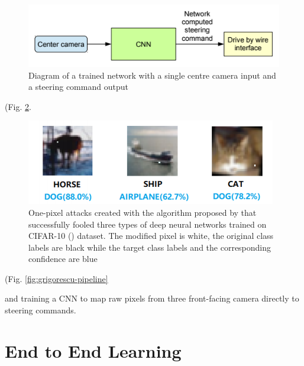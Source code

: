 \begin{figure}[ht]
 \centering 
 \includegraphics[scale=1]{Figures/bojarski-nvidia.png}
 \caption{Diagram of a trained network with a single centre camera input and a steering command output}
 \label{fig:bojarski-net}
\end{figure}


 (Fig. \ref{fig:one-pixel-attack}.
 
\begin{figure}[ht]
 \centering 
 \includegraphics[scale=1]{Figures/one-pixel-attack.png}
 \caption{One-pixel  attacks  created  with the algorithm proposed by \cite{Su_2019} that  successfully  fooled  three  types  of deep neural networks trained  on  CIFAR-10 (\cite{CIFAR_10}) dataset. The modified pixel is white, the original  class  labels  are   black while  the  target  class  labels  and  the corresponding confidence are blue}
 \label{fig:one-pixel-attack}
\end{figure}


(Fig. \ref{fig:grigorescu-pipeline} 

and training a CNN to map raw pixels from three front-facing camera directly to steering commands.





\section{End to End Learning}

